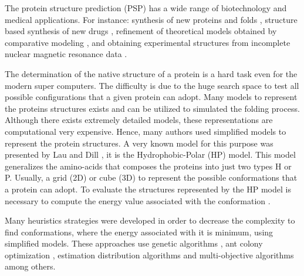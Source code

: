 \documentclass[conference]{IEEEtran}
\begin{document}
The protein structure prediction (PSP) has a wide range of biotechnology and medical applications. For instance: synthesis of new proteins and folds \cite{wang2012structural, rothlisberger2008kemp}, structure based synthesis of new drugs \cite{davis2009rosettaligand}, refinement of theoretical models obtained by comparative modeling \cite{qian2004improvement, krieger2009improving}, and
obtaining experimental structures from incomplete nuclear magnetic
resonance data  \cite{shen2009novo}.  

The determination of the native structure of a protein is a hard task even for the modern super computers. The difficulty is due to the huge search space to test all possible configurations that a given protein can adopt. Many models to represent the proteins structures exists and can be utilized to simulated the folding process. Although there exists extremely detailed models, these representations are computational very expensive. Hence, many authors \cite{custodio2004investigation,hsu2003growth,lin2011protein,unger1993genetic,santana2008protein,custodio2014multiple, garza2012locality} used simplified models to represent the protein structures. A very known model for this purpose was presented by Lau and Dill \cite{lau1989lattice}, it is the Hydrophobic-Polar (HP) model. This model generalizes the amino-acids that composes the proteins into just two types H or P. Usually, a grid (2D) or cube (3D) to represent the possible conformations that a protein can adopt. To evaluate the structures represented by the HP model is necessary to compute the energy value associated with the conformation \cite{unger1993genetic}. 


Many heuristics strategies were developed in order to decrease the complexity to find conformations, where the energy associated with it is minimum, using simplified models. These approaches use genetic algorithms \cite{unger1993genetic}, ant colony optimization \cite{shmygelska2002ant, shmygelska2003improved}, estimation distribution algorithms \cite{santana2008protein} and multi-objective algorithms \cite{gabriel2012algoritmos} among others.
\end{document}
